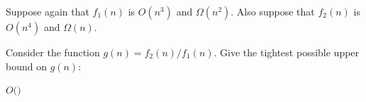 \begin{prob}
    Suppose again that $f_1(n)$ is $O(n^3)$ and $\Omega(n^2)$. Also suppose that $f_2(n)$
    is $O(n^4)$ and $\Omega(n)$.

    Consider the function $g(n) = f_2(n) / f_1(n)$. Give the tightest possible upper bound on $g(n)$:

    $O($$)$
\end{prob}
